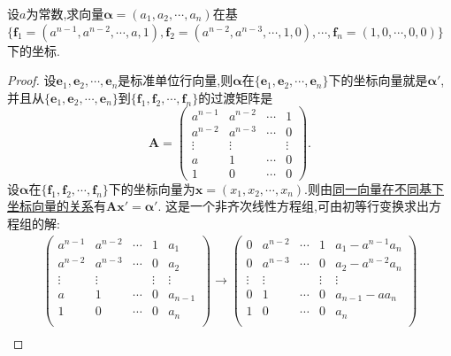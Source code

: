 \documentclass[../../main.tex]{subfiles}%
\begin{document}
\begin{example}
设\(a\)为常数,求向量\(\boldsymbol{\alpha}=(a_1,a_2,\cdots,a_n)\)在基\(\{\boldsymbol{f}_1=(a^{n - 1},a^{n - 2},\cdots,a,1),\boldsymbol{f}_2=(a^{n - 2},a^{n - 3},\cdots,1,0),\cdots,\boldsymbol{f}_n=(1,0,\cdots,0,0)\}\)下的坐标.
\end{example}
\begin{proof}
设\(\boldsymbol{e}_1,\boldsymbol{e}_2,\cdots,\boldsymbol{e}_n\)是标准单位行向量,则\(\boldsymbol{\alpha}\)在\(\{\boldsymbol{e}_1,\boldsymbol{e}_2,\cdots,\boldsymbol{e}_n\}\)下的坐标向量就是$\boldsymbol{\alpha}'$,并且从\(\{\boldsymbol{e}_1,\boldsymbol{e}_2,\cdots,\boldsymbol{e}_n\}\)到\(\{\boldsymbol{f}_1,\boldsymbol{f}_2,\cdots,\boldsymbol{f}_n\}\)的过渡矩阵是
\[
\boldsymbol{A}=\begin{pmatrix}
a^{n - 1}&a^{n - 2}&\cdots&1\\
a^{n - 2}&a^{n - 3}&\cdots&0\\
\vdots&\vdots&&\vdots\\
a&1&\cdots&0\\
1&0&\cdots&0
\end{pmatrix}.
\]
设\(\boldsymbol{\alpha}\)在\(\{\boldsymbol{f}_1,\boldsymbol{f}_2,\cdots,\boldsymbol{f}_n\}\)下的坐标向量为\(\boldsymbol{x}=(x_1,x_2,\cdots,x_n)\).则由\hyperref[theorem:同一向量在不同基下坐标向量的关系]{同一向量在不同基下坐标向量的关系}有\(\boldsymbol{A}\boldsymbol{x}'=\boldsymbol{\alpha}'\). 这是一个非齐次线性方程组,可由初等行变换求出方程组的解:
\begin{gather*}
\left( \begin{matrix}
a^{n-1}&		a^{n-2}&		\cdots&		1&		a_1\\
a^{n-2}&		a^{n-3}&		\cdots&		0&		a_2\\
\vdots&		\vdots&		&		\vdots&		\vdots\\
a&		1&		\cdots&		0&		a_{n-1}\\
1&		0&		\cdots&		0&		a_n\\
\end{matrix} \right) \rightarrow \left( \begin{matrix}
0&		a^{n-2}&		\cdots&		1&		a_1-a^{n-1}a_n\\
0&		a^{n-3}&		\cdots&		0&		a_2-a^{n-2}a_n\\
\vdots&		\vdots&		&		\vdots&		\vdots\\
0&		1&		\cdots&		0&		a_{n-1}-aa_n\\
1&		0&		\cdots&		0&		a_n\\
\end{matrix} \right) 
\\

\end{gather*}
\end{proof}
\end{document}
